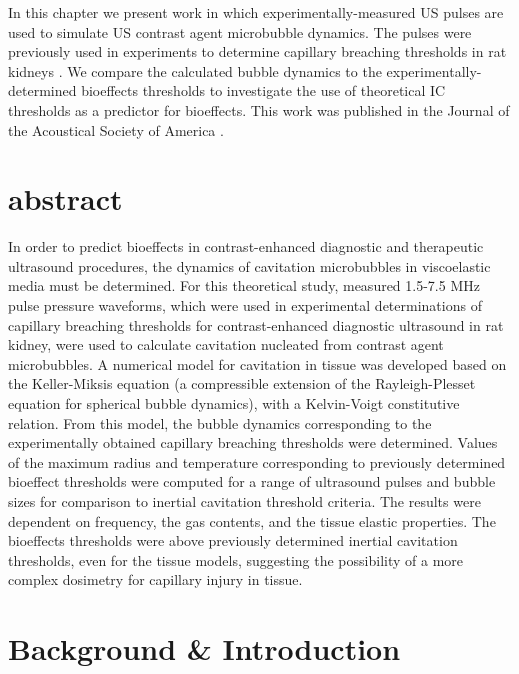 In this chapter we present work in which experimentally-measured
\ac{US} pulses are used to simulate \ac{US} contrast agent microbubble
dynamics. The pulses were previously used in experiments to determine
capillary breaching thresholds in rat kidneys \citep{Miller2008b}. We
compare the calculated bubble dynamics to the
experimentally-determined bioeffects thresholds to investigate the use
of theoretical \ac{IC} thresholds as a predictor for bioeffects. This
work was published in the Journal of the Acoustical Society of America
\citep{Patterson2012, Patterson2012a}.

\section{abstract}
  In order to predict bioeffects in contrast-enhanced diagnostic and
  therapeutic ultrasound procedures, the dynamics of cavitation
  microbubbles in viscoelastic media must be determined.  For this
  theoretical study, measured 1.5-7.5 MHz pulse pressure waveforms,
  which were used in experimental determinations of capillary
  breaching thresholds for contrast-enhanced diagnostic ultrasound in
  rat kidney, were used to calculate cavitation nucleated from
  contrast agent microbubbles.  A numerical model for cavitation in
  tissue was developed based on the Keller-Miksis equation (a
  compressible extension of the Rayleigh-Plesset equation for
  spherical bubble dynamics), with a Kelvin-Voigt constitutive
  relation. From this model, the bubble dynamics corresponding to the
  experimentally obtained capillary breaching thresholds were
  determined. Values of the maximum radius and temperature
  corresponding to previously determined bioeffect thresholds were
  computed for a range of ultrasound pulses and bubble sizes for
  comparison to inertial cavitation threshold criteria.  The results
  were dependent on frequency, the gas contents, and the tissue
  elastic properties.  The bioeffects thresholds were above previously
  determined inertial cavitation thresholds, even for the tissue
  models, suggesting the possibility of a more complex dosimetry for
  capillary injury in tissue.

\acresetall

\section{Background \& Introduction}
\label{sec:usbe_bubble_intro}


